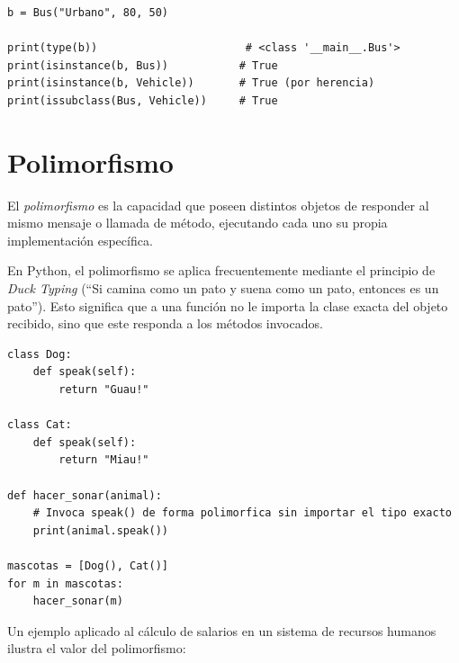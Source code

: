 \begin{lstlisting}[caption={Uso de \texttt{isinstance()} e \texttt{issubclass()}.}, label={list:inspeccion_tipos}]
b = Bus("Urbano", 80, 50)

print(type(b))                       # <class '__main__.Bus'>
print(isinstance(b, Bus))           # True
print(isinstance(b, Vehicle))       # True (por herencia)
print(issubclass(Bus, Vehicle))     # True
\end{lstlisting}

\section{Polimorfismo}
El \textit{polimorfismo} es la capacidad que poseen distintos objetos de responder al mismo mensaje o llamada
de método, ejecutando cada uno su propia implementación específica.

En Python, el polimorfismo se aplica frecuentemente mediante el principio de \textit{Duck Typing} (``Si camina como
un pato y suena como un pato, entonces es un pato''). Esto significa que a una función no le importa la clase exacta
del objeto recibido, sino que este responda a los métodos invocados.

\begin{lstlisting}[caption={Polimorfismo con jerarquía de animales.}, label={list:polimorfismo_animales}]
class Dog:
    def speak(self):
        return "Guau!"

class Cat:
    def speak(self):
        return "Miau!"

def hacer_sonar(animal):
    # Invoca speak() de forma polimorfica sin importar el tipo exacto
    print(animal.speak())

mascotas = [Dog(), Cat()]
for m in mascotas:
    hacer_sonar(m)
\end{lstlisting}

Un ejemplo aplicado al cálculo de salarios en un sistema de recursos humanos ilustra el valor del polimorfismo:

